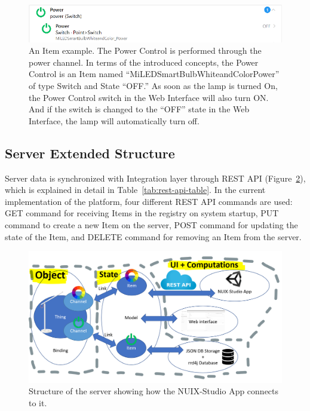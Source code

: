 \begin{figure}
  \centering
  \includegraphics[width=0.9\linewidth]{figures/XiaomiLampPowerItem.png}
  \caption{An Item example. The Power Control is performed through the power channel. In terms of the introduced concepts, the Power Control is an Item named ``MiLEDSmartBulbWhiteandColorPower'' of type Switch and State ``OFF.'' As soon as the lamp is turned On, the Power Control switch in the Web Interface will also turn ON. And if the switch is changed to the ``OFF'' state in the Web Interface, the lamp will automatically turn off.}
  \label{fig:XiaomiLampPowerItem-figure}
\end{figure}

\subsection{Server Extended Structure}

Server data is synchronized with Integration layer through REST API (Figure~\ref{fig:ExtendedServerStructure-figure}), which is explained in detail in Table~\ref{tab:rest-api-table}. In the current implementation of the platform, four different REST API commands are used: GET command for receiving Items in the registry on system startup, PUT command to create a new Item on the server, POST command for updating the state of the Item, and DELETE command for removing an Item from the server.

\begin{figure}
  \centering
  \includegraphics[width=0.9\linewidth]{figures/ExtendedServerStructure.png}
  \caption{Structure of the server showing how the NUIX-Studio App connects to it.}
  \label{fig:ExtendedServerStructure-figure}
\end{figure}

